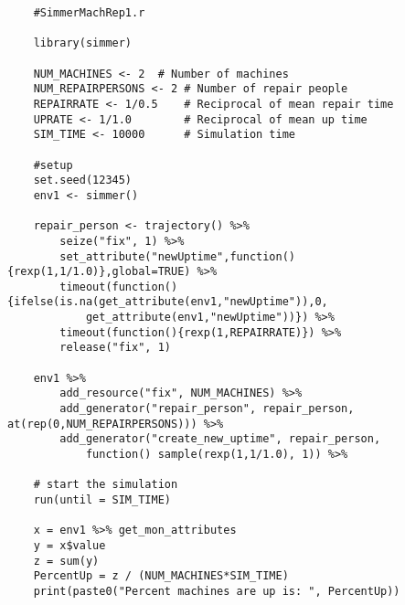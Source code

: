 \documentclass[titlepage]{article}
\begin{document}
\begin{verbatim}
	#SimmerMachRep1.r

    library(simmer)

    NUM_MACHINES <- 2  # Number of machines
    NUM_REPAIRPERSONS <- 2 # Number of repair people
    REPAIRRATE <- 1/0.5    # Reciprocal of mean repair time
    UPRATE <- 1/1.0        # Reciprocal of mean up time 
    SIM_TIME <- 10000      # Simulation time 

    #setup
    set.seed(12345)
    env1 <- simmer()

    repair_person <- trajectory() %>%
        seize("fix", 1) %>%
        set_attribute("newUptime",function(){rexp(1,1/1.0)},global=TRUE) %>%
        timeout(function() {ifelse(is.na(get_attribute(env1,"newUptime")),0,
            get_attribute(env1,"newUptime"))}) %>%
        timeout(function(){rexp(1,REPAIRRATE)}) %>%
        release("fix", 1) 

    env1 %>%
        add_resource("fix", NUM_MACHINES) %>%
        add_generator("repair_person", repair_person, at(rep(0,NUM_REPAIRPERSONS))) %>%
        add_generator("create_new_uptime", repair_person, 
            function() sample(rexp(1,1/1.0), 1)) %>%

    # start the simulation
    run(until = SIM_TIME)

    x = env1 %>% get_mon_attributes
    y = x$value
    z = sum(y)
    PercentUp = z / (NUM_MACHINES*SIM_TIME)
    print(paste0("Percent machines are up is: ", PercentUp))

\end{verbatim}

\clearpage
\end{document}
